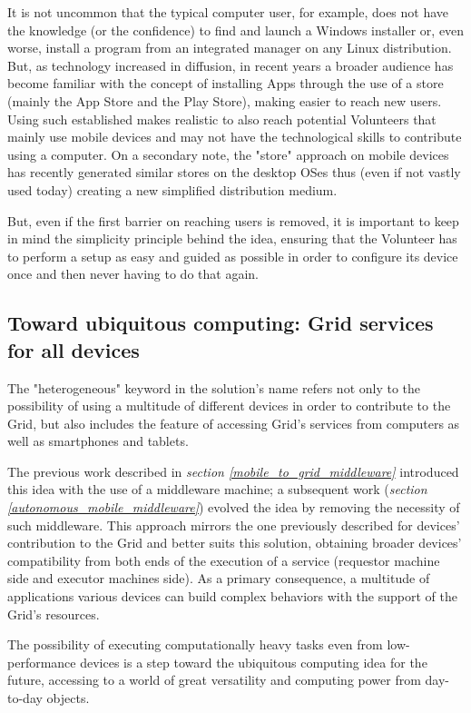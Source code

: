 It is not uncommon that the typical computer user, for example, does not have the knowledge (or the confidence) to find and launch a Windows installer or, even worse, install a program from an integrated manager on any Linux distribution. But, as technology increased in diffusion, in recent years a broader audience has become familiar with the concept of installing Apps through the use of a store (mainly the App Store and the Play Store), making easier to reach new users. Using such established makes realistic to also reach potential Volunteers that mainly use mobile devices and may not have the technological skills to contribute using a computer. On a secondary note, the "store" approach on mobile devices has recently generated similar stores on the desktop OSes thus (even if not vastly used today) creating a new simplified distribution medium.

But, even if the first barrier on reaching users is removed, it is important to keep in mind the simplicity principle behind the idea, ensuring that the Volunteer has to perform a setup as easy and guided as possible in order to configure its device once and then never having to do that again.

\subsection{Toward ubiquitous computing: Grid services for all devices}\label{grid_services_for_all_devices}
The "heterogeneous" keyword in the solution's name refers not only to the possibility of using a multitude of different devices in order to contribute to the Grid, but also includes the feature of accessing Grid's services from computers as well as smartphones and tablets.

The previous work described in \textit{section \ref{mobile_to_grid_middleware}} introduced this idea with the use of a middleware machine; a subsequent work (\textit{section \ref{autonomous_mobile_middleware}}) evolved the idea by removing the necessity
of such middleware. This approach mirrors the one previously described for devices' contribution to the Grid and better suits this solution, obtaining broader devices' compatibility from both ends of the execution of a service (requestor machine side and executor machines side). As a primary consequence, a multitude of applications various devices can build complex behaviors with the support of the Grid's resources.

The possibility of executing computationally heavy tasks even from low-performance devices is a step toward the ubiquitous computing idea for the future, accessing to a world of great versatility and computing power from day-to-day objects.

